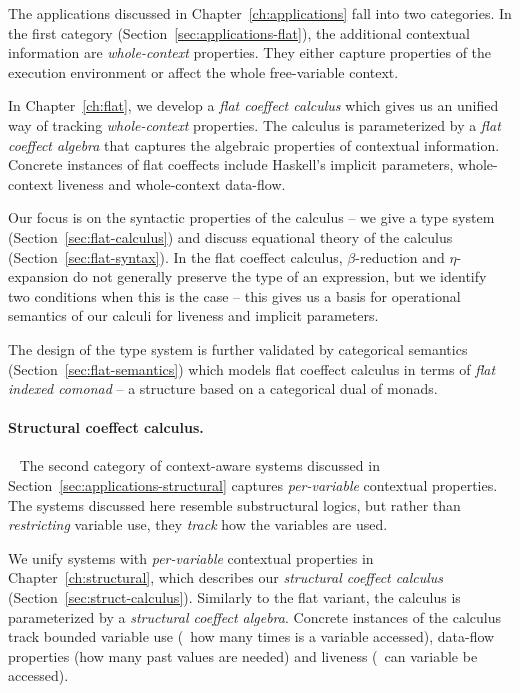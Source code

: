 The applications discussed in Chapter~\ref{ch:applications} fall into two categories. In the first
category (Section~\ref{sec:applications-flat}), the additional contextual information are
\emph{whole-context} properties. They either capture properties of the execution environment or
affect the whole free-variable context.

In Chapter~\ref{ch:flat}, we develop a \emph{flat coeffect calculus} which gives us an unified way
of tracking \emph{whole-context} properties. The calculus is parameterized by a \emph{flat coeffect
algebra} that captures the algebraic properties of contextual information. Concrete
instances of flat coeffects include Haskell's implicit parameters, whole-context liveness and
whole-context data-flow.

Our focus is on the syntactic properties of the calculus -- we give a type system
(Section~\ref{sec:flat-calculus}) and discuss equational theory of the calculus (Section~\ref{sec:flat-syntax}).
In the flat coeffect calculus, $\beta$-reduction and $\eta$-expansion do not generally preserve
the type of an expression, but we identify two conditions when this is the case -- this gives us
a basis for operational semantics of our calculi for liveness and implicit parameters.

The design of the type system is further validated by categorical semantics
(Section~\ref{sec:flat-semantics}) which models flat coeffect calculus in terms of
\emph{flat indexed comonad} -- a structure based on a categorical dual of monads.


\paragraph{Structural coeffect calculus.}

~ The second category of context-aware systems discussed in Section~\ref{sec:applications-structural}
captures \emph{per-variable} contextual properties. The systems discussed here resemble substructural
logics, but rather than \emph{restricting} variable use, they \emph{track} how the variables are used.

We unify systems with \emph{per-variable} contextual properties in Chapter~\ref{ch:structural},
which describes our \emph{structural coeffect calculus} (Section~\ref{sec:struct-calculus}).
Similarly to the flat variant, the calculus is parameterized by a \emph{structural coeffect algebra}.
Concrete instances of the calculus track bounded variable use (\ie~how many times is a variable
accessed), data-flow properties (how many past values are needed) and liveness (\ie~can variable
be accessed).

